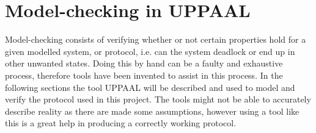\chapter{Model-checking in UPPAAL}
Model-checking consists of verifying whether or not certain properties hold for a given modelled system, or protocol, i.e. can the system deadlock or end up in other unwanted states.
Doing this by hand can be a faulty and exhaustive process, therefore tools have been invented to assist in this process. In the following sections the tool UPPAAL will be described and used to model and verify the protocol used in this project. 
The tools might not be able to accurately describe reality as there are made some assumptions, however using a tool like this is a great help in producing a correctly working protocol. 



